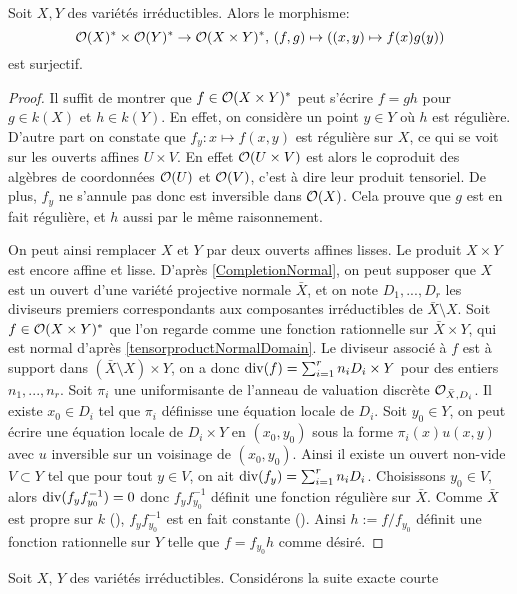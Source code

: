 \begin{prop}
Soit $X, Y$ des variétés irréductibles. Alors le morphisme:
$$\mathcal{O}(X)^*\times\mathcal{O}(Y)^*\rightarrow\mathcal{O}(X\times Y)^*,\,(f,g)\mapsto ((x,y )\mapsto f(x)g(y))$$
est surjectif.
\end{prop}
\begin{proof}
Il suffit de montrer que $f\in \mathcal{O}(X\times Y)^*$ peut s'écrire $f=gh$ pour $g\in k(X)$ et $h\in k(Y)$. En effet, on considère un point $y\in Y$ où $h$ est régulière. D'autre part on constate que $f_y:x\mapsto f(x,y)$ est régulière sur $X$, ce qui se voit sur les ouverts affines $U\times V$. En effet $\mathcal{O}(U\times V)$ est alors le coproduit des algèbres de coordonnées $\mathcal{O}(U)$ et $\mathcal{O}(V)$, c'est à dire leur produit tensoriel. De plus, $f_y$ ne s'annule pas donc est inversible dans $\mathcal{O}(X)$. Cela prouve que $g$ est en fait régulière, et $h$ aussi par le même raisonnement.

On peut ainsi remplacer $X$ et $Y$ par deux ouverts affines lisses. Le produit  $X\times Y$ est encore affine et lisse. D'après \ref{CompletionNormal}, on peut supposer que $X$ est un ouvert d'une variété projective normale $\bar{X}$, et on note $D_1,...,D_r$ les diviseurs premiers correspondants aux composantes irréductibles de $\bar{X}\setminus X$. Soit $f\in \mathcal{O}(X\times Y)^*$ que l'on regarde comme une fonction rationnelle sur $\bar{X}\times Y$, qui est normal d'après \ref{tensorproductNormalDomain}. Le diviseur associé à $f$ est à support dans $(\bar{X}\setminus X)\times Y$, on a donc $\operatorname{div}(f)=\sum_{i=1}^rn_iD_i\times Y$ pour des entiers $n_1,...,n_r$. Soit $\pi_i$ une uniformisante de l'anneau de valuation discrète $\mathcal{O}_{\bar{X},D_i}$. Il existe $x_0\in D_i$ tel que $\pi_i$ définisse une équation locale de $D_i$. Soit $y_0\in Y$, on peut écrire une équation locale de $D_i\times Y$ en $(x_0,y_0)$ sous la forme $\pi_i(x)u(x,y)$ avec $u$ inversible sur un voisinage de $(x_0,y_0)$. Ainsi il existe un ouvert non-vide $V\subset Y$ tel que pour tout $y\in V$, on ait $\operatorname{div}(f_y)=\sum_{i=1}^rn_iD_i$. Choisissons $y_0\in V$, alors $\operatorname{div}(f_yf_{y_0}^{-1})=0$ donc $f_yf_{y_0}^{-1}$ définit une fonction régulière sur $\bar{X}$. Comme $\bar{X}$ est propre sur $k$ (\cite[II.4.9]{Hartshorne}), $f_yf_{y_0}^{-1}$ est en fait constante (\cite[ex II.4.4]{Hartshorne}). Ainsi $h:=f/f_{y_0}$ définit une fonction rationnelle sur $Y$ telle que $f=f_{y_0}h$ comme désiré.
\end{proof}

\noindent Soit $X,\,Y$ des variétés irréductibles. Considérons la suite exacte courte


